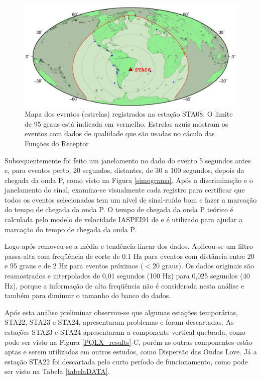 \begin{figure}[!ht]
\centering
\includegraphics[scale=0.5]{Figs/mapa_de_eventos.png}
\caption[Mapa dos eventos registrados na estação STA08.]{Mapa dos eventos (estrelas) registrados na estação STA08. O limite de 95 graus está indicada em vermelho. Estrelas azuis mostram os eventos com dados de qualidade que são usadas no cáculo das Funções do Receptor}
\label{mapa_eventos}
\end{figure}

Subsequentemente foi feito um janelamento no dado do evento 5 segundos antes e, para eventos perto, 20 segundos, distantes, de 30 a 100 segundos, depois da chegada da onda P, como visto na Figura \ref{simograma}. Após a discriminação e o janelamento do sinal, examina-se visualmente cada registro para certificar que todos os eventos selecionados tem um nível de sinal-ruído bom e fazer a marcação do tempo de chegada da onda P. O tempo de chegada da onda P teórico é calculada pelo modelo de velocidade IASPEI91 de \cite{kennet_iaspei_1991} e é utilizado para ajudar a marcação do tempo de chegada da onda P.

Logo após removeu-se a média e tendência linear dos dados. Aplicou-se um filtro passa-alta com freqüência de corte de 0.1 Hz para eventos com distância entre 20 e 95 graus e de 2 Hz para eventos próximos ($<$20 graus). Os dados originais são reamostrados e interpolados de 0,01 segundos (100 Hz) para 0,025 segundos (40 Hz), porque a informação de alta freqüência não é considerada nesta análise e também para diminuir o tamanho do banco do dados.

Após esta análise preliminar observou-se que algumas estações temporárias, STA22, STA23 e STA24, apresentaram problemas e foram descartadas. As estações STA23 e STA24 apresentaram a componente vertical quebrada, como pode ser visto na Figura \ref{PQLX_results}-C, porém as outras componentes estão aptas e serem utilizadas em outros estudos, como Dispersão das Ondas Love. Já a estação STA22 foi descartada pelo curto período de funcionamento, como pode ser visto na Tabela \ref{tabelaDATA}.


